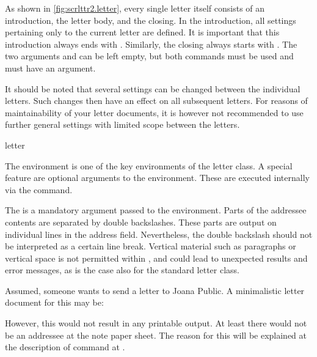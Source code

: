 As shown in \autoref{fig:scrlttr2.letter}, every single letter itself consists
of an introduction, the letter body, and the closing. In the introduction, all
settings pertaining only to the current letter are defined. It is important
that this introduction always ends with
. Similarly, the closing always starts with
. The two arguments  and
 can be left empty, but both commands must be used and must
have an argument.

It should be noted that several settings can be changed between the individual
letters. Such changes then have an effect on all subsequent letters. For
reasons of maintainability of your letter documents, it is however not
recommended to use further general settings with limited scope between the
letters.

\begin{Declaration}
  \begin{Environment}{letter}
  \end{Environment}
\end{Declaration}
%
The  environment is one of the key environments of the
letter class. A special
 feature are optional arguments to the 
environment. These  are executed internally via the
 command.

The  is a mandatory argument passed to the
 environment. Parts of the addressee
contents are separated by double backslashes. These parts are output on
individual lines in the address field. Nevertheless, the double backslash
should not be interpreted as a certain line break. Vertical material such as
paragraphs or vertical space is not permitted within , and
could lead to unexpected results and error messages, as is the case also for
the standard letter class.

\begin{Example}
  \label{desc:scrlttr2.env.letter.example}%
  Assumed, someone wants to send a letter to Joana Public. A minimalistic
  letter document for this may be:
  However, this would not result in any printable output. At least there
  would not be an addressee at the note paper sheet. The reason for this will
  be explained at the description of command  at
  .
\end{Example}
%
\EndIndexGroup


